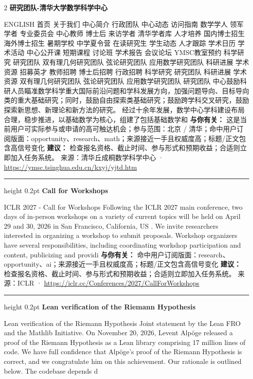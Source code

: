 \documentclass[10.5pt]{ctexart}
\begin{document}
\begin{multicols}{2}
{\large\bfseries 研究团队-清华大学数学科学中心}\par
ENGLISH 首页 关于我们 中心简介 行政团队 中心动态 访问指南 数学学人 领军学者 专业委员会 中心教师 博士后 来访学者 清华学者库 人才培养 国内博士招生 海外博士招生 暑期学校 中学夏令营 在读研究生 学生动态 人才跟踪 学术日历 学术活动 中心公开课 短期课程 讨论班 学术报告 会议论坛 YMSC教室预约 科学研究 研究团队 双有理几何研究团队 弦论研究团队 应用数学研究团队 科研进展 学术资源 招募英才 教师招聘 博士后招聘 行政招聘 科学研究 研究团队 科研进展 学术资源 双有理几何研究团队 弦论研究团队 应用数学研究团队 研究团队 中心鼓励科研人员瞄准数学科学重大国际前沿问题和学科发展方向，加强问题导向、目标导向类的重大基础研究；同时，鼓励自由探索类基础研究；鼓励跨学科交叉研究，鼓励探索新思想、新理论和新方法的研究。 经过十余年发展，数学中心学科建设布局合理，稳步推进，以基础数学为核心，组建了包括基础数学和
\textbf{与你有关：} 这是当前用户可实际参与或申请的高可触达机会；参与范围：北京 / 清华；命中用户订阅版面：opportunity、research、math；来源接近一手且权威度高；标题/正文包含高信号变化
\textbf{建议：} 检查报名资格、截止时间、参与形式和预期收益；合适则立即加入任务系统。
{\footnotesize\color{ormuted} 来源：清华丘成桐数学科学中心 · \url{https://ymsc.tsinghua.edu.cn/kxyj/yjtd.htm}}
\vspace{2mm}
\hrule height 0.2pt
\vspace{2mm}
{\large\bfseries Call for Workshops}\par
ICLR 2027 - Call for Workshops Following the ICLR 2027 main conference, two days of in-person workshops on a variety of current topics will be held on April 29 and 30, 2026 in San Francisco, California, US . We invite researchers interested in organizing a workshop to submit proposals. Workshop organizers have several responsibilities, including coordinating workshop participation and content, publicizing and providi
\textbf{与你有关：} 命中用户订阅版面：research、opportunity、ai；来源接近一手且权威度高；标题/正文包含高信号变化
\textbf{建议：} 检查报名资格、截止时间、参与形式和预期收益；合适则立即加入任务系统。
{\footnotesize\color{ormuted} 来源：ICLR · \url{https://iclr.cc/Conferences/2027/CallForWorkshops}}
\vspace{2mm}
\hrule height 0.2pt
\vspace{2mm}
{\large\bfseries Lean verification of the Riemann Hypothesis}\par
Lean verification of the Riemann Hypothesis Joint statement by the Lean FRO and the Mathlib Initiative. On November 20, 2026, Levent Alpöge released a proof of the Riemann Hypothesis as a Lean library comprising 17 million lines of code. We have full confidence that Alpöge's proof of the Riemann Hypothesis is correct, and we congratulate him on this achievement. Our rationale is outlined below. The codebase depends d

\end{multicols}
\end{document}
